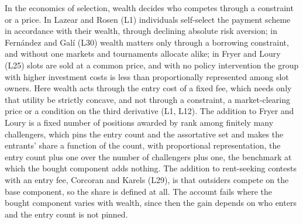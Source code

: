 In the economics of selection, wealth decides who competes through a constraint
or a price. In Lazear and Rosen (L1) individuals self-select the payment scheme
in accordance with their wealth, through declining absolute risk aversion; in
Fernández and Galí (L30) wealth matters only through a borrowing constraint, and
without one markets and tournaments allocate alike; in Fryer and Loury (L25)
slots are sold at a common price, and with no policy intervention the group with
higher investment costs is less than proportionally represented among slot
owners. Here wealth acts through the entry cost of a fixed fee, which needs only
that utility be strictly concave, and not through a constraint, a
market-clearing price or a condition on the third derivative (L1, L12). The
addition to Fryer and Loury is a fixed number of positions awarded by rank among
finitely many challengers, which pins the entry count and the assortative set
and makes the entrants' share a function of the count, with proportional
representation, the entry count plus one over the number of challengers plus
one, the benchmark at which the bought component adds nothing. The addition to
rent-seeking contests with an entry fee, Corcoran and Karels (L29), is that
outsiders compete on the base component, so the share is defined at all. The
account fails where the bought component varies with wealth, since then the gain
depends on who enters and the entry count is not pinned.

